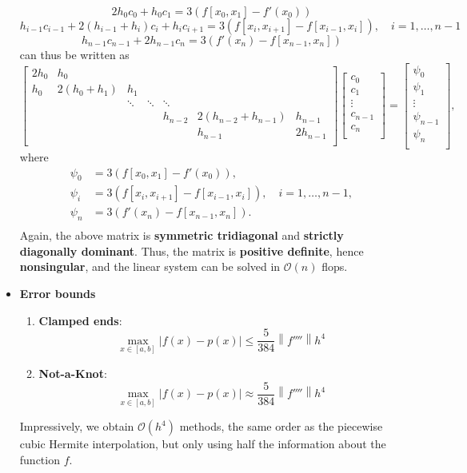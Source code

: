 \documentclass{report}
\begin{document}
\begin{itemize}
            $$2h_0 c_0 + h_0 c_1 = 3\left(f[x_0,x_1] - f'(x_0)\right)$$
            $$h_{i-1}c_{i-1} + 2(h_{i-1} + h_i )c_i + h_i c_{i+1} = 3\left(f[x_i,x_{i+1}] - f[x_{i-1},x_{i}]\right), \quad i=1,\ldots,n-1$$
            $$h_{n-1} c_{n-1} + 2 h_{n-1} c_n = 3\left(f'(x_n) - f[x_{n-1},x_n]\right)$$
            can thus be written as
            $$
            \begin{bmatrix}
                2h_0 & h_0\\
                h_0& 2(h_0 + h_1) & h_1 \\
                   & &\ddots & \ddots & \ddots \\
                   &&&& h_{n-2} & 2(h_{n-2} + h_{n-1}) & h_{n-1} \\
                   &&&&& h_{n-1} & 2h_{n-1} \\
            \end{bmatrix}
            \begin{bmatrix}
                c_0\\c_1\\\vdots\\c_{n-1}\\c_n\\
            \end{bmatrix}
            =
            \begin{bmatrix}
                \psi_0\\\psi_1\\\vdots\\\psi_{n-1}\\\psi_n\\
            \end{bmatrix},
            $$
            where
            \begin{align*}
                \psi_0 &= 3\left(f[x_0,x_1] - f'(x_0)\right),\\
                \psi_i &= 3\left(f[x_i,x_{i+1}] - f[x_{i-1},x_{i}]\right), \quad i = 1,\ldots,n-1, \\
                \psi_n &= 3\left(f'(x_n) - f[x_{n-1},x_n]\right).\\
            \end{align*}
            Again, the above matrix is \textbf{symmetric tridiagonal} and \textbf{strictly diagonally dominant}.
            \bigbreak \noindent 
        Thus, the matrix is \textbf{positive definite}, hence \textbf{nonsingular}, and the linear system can be solved in $\mathcal{O}(n)$ flops.
    \item \textbf{Error bounds}
        \begin{enumerate}
            \item \textbf{Clamped ends}:
                $$\max_{x \in [a,b]} \left|f(x) - p(x) \right| \leq \frac{5}{384} \left\|f''''\right\| h^4$$
            \item \textbf{Not-a-Knot}:
                $$\max_{x \in [a,b]} \left|f(x) - p(x) \right| \approx \frac{5}{384} \left\|f''''\right\| h^4$$
        \end{enumerate}
        Impressively, we obtain $\mathcal{O}(h^4)$ methods, the same order as the piecewise cubic Hermite interpolation, but only using half the information about the function $f$.


\end{itemize}
\end{document}
